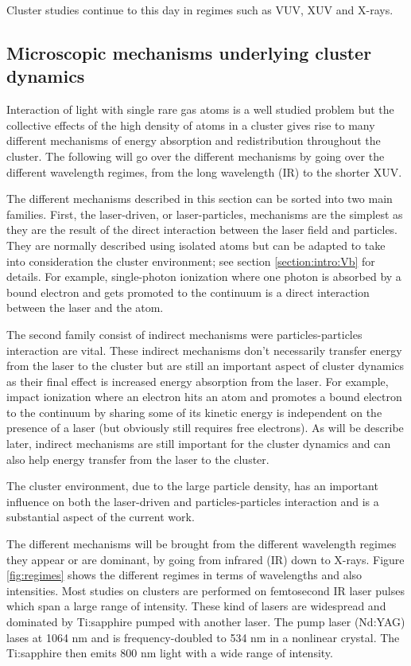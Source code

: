 Cluster studies continue to this day in regimes such as VUV\cite{Arbeiter2011},
XUV\cite{Murphy2008a,Murphy2008b,Krikunova2012} and X-rays\cite{Ziaja2009b}.




\subsection{Microscopic mechanisms underlying cluster dynamics}
\label{section:intro:mechanisms}
Interaction of light with single rare gas atoms is a well studied problem but
the collective effects of the high density of atoms in a cluster gives rise to
many different mechanisms of energy absorption and redistribution throughout the
cluster. The following will go over the different mechanisms by going over the
different wavelength regimes, from the long wavelength (IR) to the shorter XUV.

The different mechanisms described in this section can be sorted into two main
families. First, the laser-driven, or laser-particles, mechanisms are the
simplest as they are the result of the direct interaction between the laser
field and particles. They are normally described using isolated atoms but can
be adapted to take into consideration the cluster environment; see section
\ref{section:intro:Vb} for details. For example, single-photon ionization where
one photon is absorbed by a bound electron and gets promoted to the continuum is
a direct interaction between the laser and the atom.

The second family consist of indirect mechanisms were particles-particles
interaction are vital. These indirect mechanisms don't necessarily transfer
energy from the laser to the cluster but are still an important aspect of
cluster dynamics as their final effect is increased energy absorption from the
laser. For example, impact ionization where
an electron hits an atom and promotes a bound electron to the continuum by
sharing some of its kinetic energy is independent on the presence of a laser
(but obviously still requires free electrons). As will be describe later,
indirect mechanisms are still important for the cluster dynamics and can also
help energy transfer from the laser to the cluster.

The cluster environment, due to the large particle density, has an important
influence on both the laser-driven and particles-particles interaction and is
a substantial aspect of the current work.

The different mechanisms will be brought from the different wavelength regimes
they appear or are dominant, by going from infrared (IR) down to X-rays. Figure
\ref{fig:regimes} shows the different regimes in terms of wavelengths and also
intensities. Most studies on clusters are performed on femtosecond IR laser
pulses which span a large range of intensity. These kind of lasers are
widespread and dominated by Ti:sapphire pumped with another laser. The pump
laser (Nd:YAG) lases at 1064 nm and is frequency-doubled to 534 nm in a
nonlinear crystal. The Ti:sapphire then emits 800 nm light with a wide range of
intensity.

